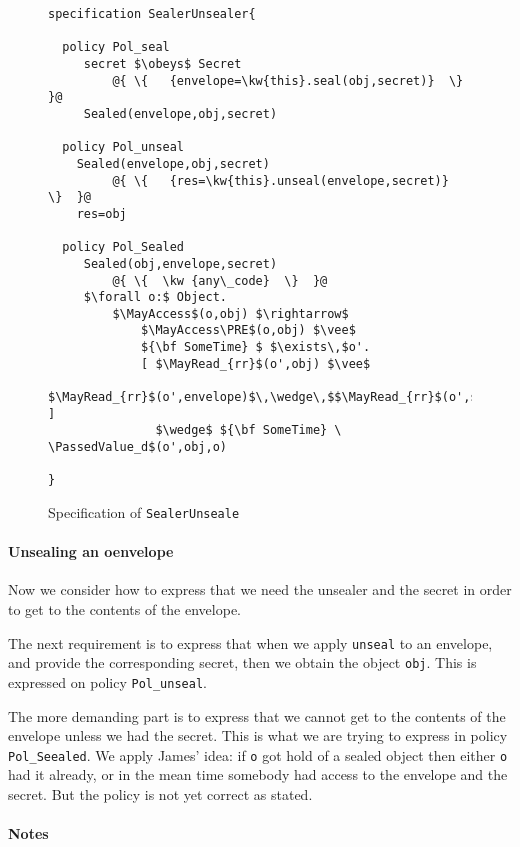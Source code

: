 \documentclass{llncs}
\newcommand{\prg}[1]{{\mbox{\tt{#1}}}}
\begin{document}
\begin{figure}[htb]
\begin{lstlisting}[escapechar=@]
specification SealerUnsealer{

  policy Pol_seal
     secret $\obeys$ Secret 
         @{ \{   {envelope=\kw{this}.seal(obj,secret)}  \}  }@
     Sealed(envelope,obj,secret)	

  policy Pol_unseal
    Sealed(envelope,obj,secret) 
         @{ \{   {res=\kw{this}.unseal(envelope,secret)}  \}  }@
    res=obj 

  policy Pol_Sealed 
     Sealed(obj,envelope,secret)
         @{ \{  \kw {any\_code}  \}  }@
     $\forall o:$ Object. 
         $\MayAccess$(o,obj) $\rightarrow$ 
             $\MayAccess\PRE$(o,obj) $\vee$ 
             ${\bf SomeTime} $ $\exists\,$o'. 
             [ $\MayRead_{rr}$(o',obj) $\vee$
               $\MayRead_{rr}$(o',envelope)$\,\wedge\,$$\MayRead_{rr}$(o',secret) ]
               $\wedge$ ${\bf SomeTime} \ \PassedValue_d$(o',obj,o) 
                
}
\end{lstlisting}
\caption{Specification of \prg{SealerUnseale}}
\label{fig:SpecSealerUnsealer}
\end{figure}


\paragraph{Unsealing an oenvelope} Now we consider how to express that we need the unsealer and the secret in order to get to the contents of the envelope.  
 
 The next requirement is to express that when we apply \prg{unseal} to an envelope, and provide the corresponding secret, then we obtain the object \prg{obj}. This is expressed on policy \prg{Pol\_unseal}.
 
The more demanding part is to express that we cannot get to the contents of the envelope unless we had the secret. This is what we are trying to express in policy \prg{Pol\_Seealed}. We apply  James' idea: if \prg{o}  got hold of a sealed object then either \prg{o} had it already, or   in the mean time somebody had access to the envelope and the secret. But the policy is not yet correct as stated.
 
\paragraph{Notes}
\end{document}

